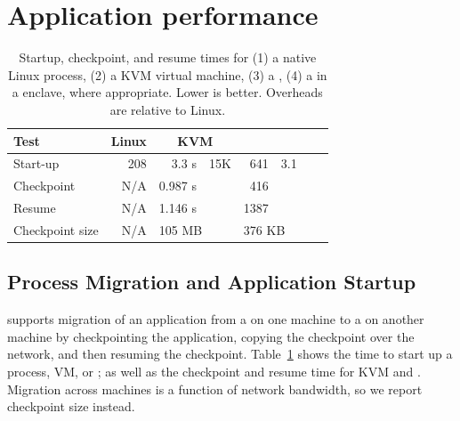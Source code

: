 \section{Application performance}
\label{sec:eval:apps}

\makeatletter
{}
\makeatother
\graphicspath{{eval/apps/figures/}}

\begin{table}[t!b!]
\footnotesize
\centering
\begin{tabular}{|l|r|rr|rr|rr|}
\hline
{\bf Test } & {\bf Linux } & \multicolumn{2}{c|}{{\bf KVM}}
& \multicolumn{2}{c|}{{\bf \graphene{}}} \\\hline

Start-up   & 208 \us{} & 3.3 s & 15K\x{} & 641 \us{} & 3.1\x{}  \\
\hline
Checkpoint & N/A   & 0.987 s  &  &   416 \us{} &  \\
\hline
Resume     & N/A   & 1.146 s  &  &  1387 \us{} & \\
\hline\hline
Checkpoint size & N/A & \multicolumn{2}{l|}{105 MB} & \multicolumn{2}{l|}{376 KB}   \\
\hline
\end{tabular}
\caption[Startup, checkpoint, and resume times in Linux, KVM, and \graphene{}]
{Startup, checkpoint, and resume times for (1) a native Linux process,
(2) a KVM virtual machine,
(3) a \graphene{} \picoproc{},
(4) a \graphene{} \picoproc{} in a \sgx{} enclave,
 where appropriate. Lower is better.  
Overheads are relative to Linux. } 
\label{tab:graphene:startup}
\end{table}


\subsection{Process Migration and Application Startup}

\graphene{} supports migration of an application from a \picoproc{} on one machine
to a \picoproc{} on another machine by checkpointing the application,
copying the checkpoint over the network, and then resuming the checkpoint.
Table~\ref{tab:graphene:startup} shows the time to start
up a process, VM, or \picoproc{}; as well as the checkpoint and resume time for KVM and \graphene{}.
Migration across machines is a function of network bandwidth,
so we report checkpoint size instead. %


